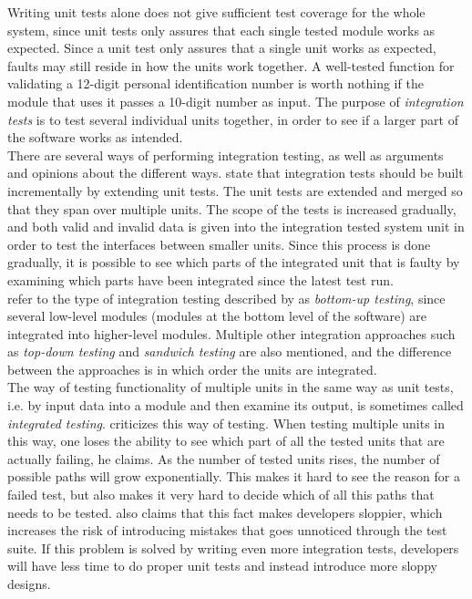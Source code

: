 Writing unit tests alone does not give sufficient test coverage for the
whole system, since unit tests only assures that each single tested
module works as expected. Since a unit test only assures that a single
unit works as expected, faults may still reside in how the units work
together. A well-tested function for validating a 12-digit personal
identification number is worth nothing if the module that uses it passes
a 10-digit number as input. The purpose of \emph{integration tests} is
to test several individual units together, in order to see if a larger
part of the software works as intended.\\

There are several ways of performing integration testing, as well as
arguments and opinions about the different ways. \citet{book:adp} state
that integration tests should be built incrementally by extending unit
tests. The unit tests are extended and merged so that they span over
multiple units. The scope of the tests is increased gradually, and both
valid and invalid data is given into the integration tested system unit
in order to test the interfaces between smaller units. Since this
process is done gradually, it is possible to see which parts of the
integrated unit that is faulty by examining which parts have been
integrated since the latest test run.\\

\citet{book:pfleeger} refer to the type of integration testing described
by \citeauthor{book:adp} as \emph{bottom-up testing}, since several
low-level modules (modules at the bottom level of the software) are
integrated into higher-level modules. Multiple other integration
approaches such as \emph{top-down testing} and \emph{sandwich testing}
are also mentioned, and the difference between the approaches is in which
order the units are integrated.\\

The way of testing functionality of multiple units in the same way as
unit tests, i.e. by input data into a module and then examine its
output, is sometimes called \emph{integrated testing}.
\citet{video:integrated_scam} criticizes this way of testing. When
testing multiple units in this way, one loses the ability to see which
part of all the tested units that are actually failing, he claims. As
the number of tested units rises, the number of possible paths will grow
exponentially. This makes it hard to see the reason for a failed test,
but also makes it very hard to decide which of all this paths that needs
to be tested. \citeauthor{video:integrated_scam} also claims that this
fact makes developers sloppier, which increases the risk of introducing
mistakes that goes unnoticed through the test suite. If this problem is
solved by writing even more integration tests, developers will have less
time to do proper unit tests and instead introduce more sloppy
designs.\\

